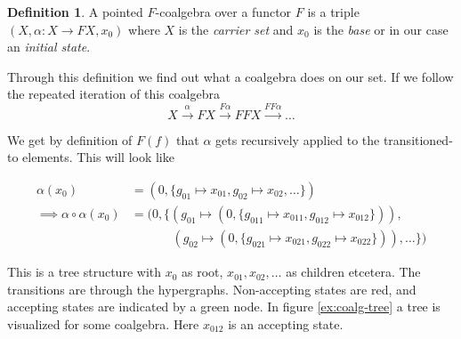 \documentclass[12pt]{article}
\theoremstyle{definition}
\newtheorem{definition}{Definition}[section]
\newcommand{\1}{\mathbbm{1}}
\begin{document}
\begin{definition}
    A pointed $F$-coalgebra over a functor $F$ is a triple $(X, \alpha: X\to FX, x_0)$ where $X$ is the \emph{carrier set} and $x_0$ is the \emph{base} or in our case an \emph{initial state}.
\end{definition}

Through this definition we find out what a coalgebra does on our set. If we follow the repeated iteration of this coalgebra
\[
    X\xrightarrow{\alpha} FX \xrightarrow{F\alpha} FFX \xrightarrow{FF\alpha} \dots
\]

We get by definition of $F(f)$ that $\alpha$ gets recursively applied to the transitioned-to elements. This will look like

\begin{align*}
    \alpha(x_0) &= (0, \{g_{01}\mapsto x_{01}, g_{02}\mapsto x_{02}, \dots\})\\
    \implies \alpha\circ\alpha(x_0) &= (0, \{(g_{01}\mapsto (0, \{g_{011}\mapsto x_{011}, g_{012}\mapsto x_{012}\})),\\
    &\hspace{40pt}(g_{02}\mapsto (0, \{g_{021}\mapsto x_{021}, g_{022}\mapsto x_{022}\})), \dots\})
\end{align*}

This is a tree structure with $x_0$ as root, $x_{01}, x_{02}, \dots$ as children etcetera. The transitions are through the hypergraphs. Non-accepting states are red, and accepting states are indicated by a green node. In figure \ref{ex:coalg-tree} a tree is visualized for some coalgebra. Here $x_{012}$ is an accepting state.
\end{document}

